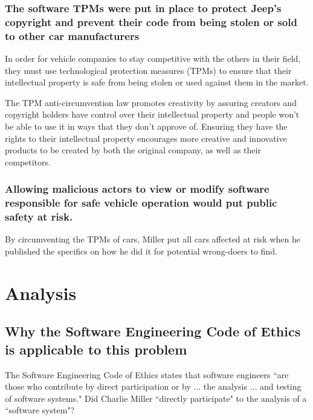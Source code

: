 \documentclass[12pt]{article}
\begin{document}
\begin{multicols}{2}
\subsubsection{The software TPMs were put in place to protect Jeep's copyright and prevent their code from being stolen or sold to other car manufacturers}

In order for vehicle companies to stay competitive with the others in their field, they must use technological protection measures (TPMs) to ensure that their intellectual property is safe from being stolen or used against them in the market. 

The TPM anti-circumvention law promotes creativity by assuring creators and copyright holders have control over their intellectual property and people won't be able to use it in ways that they don't approve of.\cite{chris} Ensuring they have the rights to their intellectual property encourages more creative and innovative products to be created by both the original company, as well as their competitors. \cite{chris}
     
\subsubsection{Allowing malicious actors to view or modify software responsible for safe vehicle operation would put public safety at risk.}

By circumventing the TPMs of cars, Miller put all cars affected at risk when he published the specifics on how he did it\cite{officialPaper} for potential wrong-doers to find.

\section{Analysis}

\subsection{Why the Software Engineering Code of Ethics is applicable to this problem}

The Software Engineering Code of Ethics states that software engineers ``are those who contribute by direct participation or by ... the analysis ... and testing of software systems."\cite{seCode} Did Charlie Miller ``directly participate" to the analysis of a ``software system"?


\end{multicols}
\end{document}
